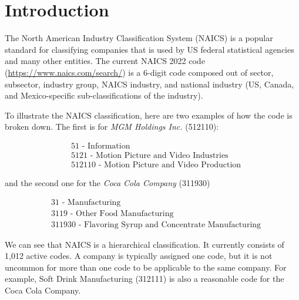 \documentclass[fleqn,moreauthors,10pt]{ds_report}
\affiliation{\textit{Advisors: Prof. Erik Štrumbelj}}
\begin{document}
\flushbottom 

\maketitle 

\thispagestyle{empty} 


\section*{Introduction}

The North American Industry Classification System (NAICS) is a popular standard for classifying companies that is used by US federal statistical agencies and many other entities. The current NAICS 2022 code (\url{https://www.naics.com/search/}) is a 6-digit code composed out of sector, subsector, industry group, NAICS industry, and national industry (US, Canada, and Mexico-specific sub-classifications of the industry).

To illustrate the NAICS classification, here are two examples of how the code is broken down. The first is for \emph{MGM Holdings Inc.} (512110): 
\begin{small}
\begin{align*}
&\text{51 - Information}\\
&\text{5121 - Motion Picture and Video Industries}\\
&\text{512110 - Motion Picture and Video Production} 
\end{align*}
\end{small}
\noindent and the second one for the \textit{Coca Cola Company} (311930)
\begin{small}
\begin{align*}
&\text{31 - Manufacturing}\\
&\text{3119 - Other Food Manufacturing}\\
&\text{311930 - Flavoring Syrup and Concentrate Manufacturing} 
\end{align*}
\end{small}

We can see that NAICS is a hierarchical classification. It currently consists of 1,012 active codes. A company is typically assigned one code, but it is not uncommon for more than one code to be applicable to the same company. For example, Soft Drink Manufacturing (312111) is also a reasonable code for the Coca Cola Company.
\end{document}
